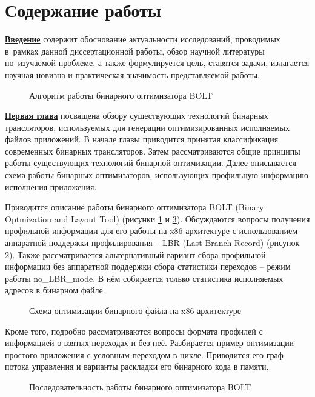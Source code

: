 \section*{Содержание работы}
\underline{\textbf{Введение}} содержит обоснование актуальности
исследований, проводимых в~рамках данной диссертационной работы,
обзор научной литературы по~изучаемой проблеме, а также формулируется цель, ставятся задачи, излагается научная новизна
и практическая значимость представляемой работы. 

\begin{figure}[!h]
    \centerfloat{
        \texttt{[image: 1]}
    }
    \caption{Алгоритм работы бинарного оптимизатора BOLT}\label{fig:BOLT}
\end{figure}

\underline{\textbf{Первая глава}} посвящена обзору существующих технологий бинарных трансляторов, используемых для генерации оптимизированных исполняемых файлов приложений. В начале главы приводится принятая классификация современных бинарных трансляторов. Затем рассматриваются общие принципы работы существующих технологий бинарной оптимизации. Далее описывается схема работы бинарных оптимизаторов, использующих  профильную информацию исполнения приложения.

Приводится описание работы бинарного оптимизатора BOLT (Binary Optmization and Layout Tool) (рисунки \cref{fig:BOLT} и \cref{fig:BinOpt}). Обсуждаются вопросы получения профильной информации для его работы на x86 архитектуре с использованием аппаратной поддержки профилирования -- LBR (Last Branch Record)  (рисунок \cref{fig:BinOptX86}). Также рассматривается альтернативный вариант сбора профильной информации без аппаратной поддержки сбора статистики  переходов -- режим работы no\_LBR\_mode. В нём собирается только статистика исполняемых адресов в бинарном файле.

\begin{figure}[!h]
    \centerfloat{
        \texttt{[image: 2]}
    }
    \caption{Схема оптимизации бинарного файла на x86 архитектуре}\label{fig:BinOptX86}
\end{figure}

Кроме того, подробно рассматриваются вопросы формата профилей с информацией о взятых переходах и без неё. Разбирается пример оптимизации простого приложения с условным переходом в цикле. Приводится его граф потока управления и варианты раскладки  его бинарного кода в памяти.

\begin{figure}[!h]
    \centerfloat{
        \texttt{[image: 3]}
    }
    \caption{Последовательность работы бинарного оптимизатора BOLT}\label{fig:BinOpt}
\end{figure}

